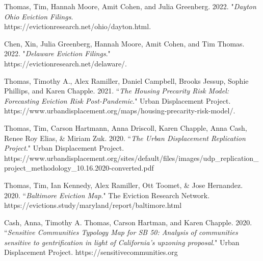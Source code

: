 \begin{cvparagraph}

Thomas, Tim, Hannah Moore, Amit Cohen, and Julia Greenberg. 2022. "\emph{Dayton Ohio Eviction Filings}.\\
https://evictionresearch.net/ohio/dayton.html. 
\end{cvparagraph}

\begin{cvparagraph}

Chen, Xin, Julia Greenberg, Hannah Moore, Amit Cohen, and Tim Thomas. 2022. "\emph{Delaware Eviction Filings}."\\
https://evictionresearch.net/delaware/. 
\end{cvparagraph}

\begin{cvparagraph}

Thomas, Timothy A., Alex Ramiller, Daniel Campbell, Brooks Jessup, Sophie Phillips, and Karen Chapple. 2021. “\emph{The Housing Precarity Risk Model: Forecasting Eviction Risk Post-Pandemic}." Urban Displacement Project. https://www.urbandisplacement.org/maps/housing-precarity-risk-model/.
\end{cvparagraph}

\begin{cvparagraph}

Thomas, Tim, Carson Hartmann, Anna Driscoll, Karen Chapple, Anna Cash, Renee Roy Elias, \& Miriam Zuk. 2020. “\emph{The Urban Displacement Replication Project}." Urban Displacement Project.\\
https://www.urbandisplacement.org/sites/default/files/images/udp\_replication\_project\_methodology\_10.16.2020-converted.pdf
\end{cvparagraph}

\begin{cvparagraph}

Thomas, Tim, Ian Kennedy, Alex Ramiller, Ott Toomet, \& Jose Hernandez. 2020. “\emph{Baltimore Eviction Map}." The Eviction Research Network.\\
https://evictions.study/maryland/report/baltimore.html
\end{cvparagraph}

\begin{cvparagraph}

Cash, Anna, Timothy A. Thomas, Carson Hartman, and Karen Chapple. 2020. “\emph{Sensitive Communities Typology Map for SB 50: Analysis of communities sensitive to gentrification in light of California's upzoning proposal}." Urban Displacement Project. https://sensitivecommunities.org
\end{cvparagraph}

